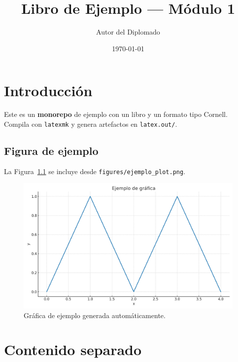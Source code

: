 \documentclass[12pt]{book}
\title{Libro de Ejemplo — Módulo 1}
\author{Autor del Diplomado}
\date{\today}
\begin{document}
\frontmatter
\maketitle

\tableofcontents

\mainmatter

\chapter{Introducción}
Este es un \textbf{monorepo} de ejemplo con un libro y un formato tipo Cornell.
Compila con \texttt{latexmk} y genera artefactos en \texttt{latex.out/}.

\section{Figura de ejemplo}
La Figura~\ref{fig:plot} se incluye desde \texttt{figures/ejemplo\_plot.png}.

\begin{figure}[h]
    \centering
    \includegraphics[width=0.7\linewidth]{ejemplo_plot.png}
    \caption{Gráfica de ejemplo generada automáticamente.}
    \label{fig:plot}
\end{figure}

\chapter{Contenido separado}




\backmatter
\end{document}
